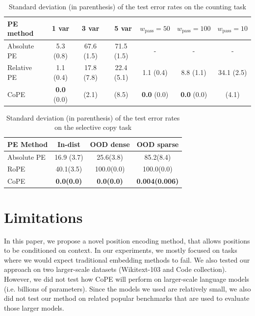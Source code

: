 \documentclass{article}
\newcommand{\ours}{CoPE\xspace}
\newcommand{\std}[1]{\small (#1)}
\begin{document}
\begin{table}[h!]
  \caption{Standard deviation (in parenthesis) of the test error rates on the counting task}
  \label{tab:count_std}
  \centering
  \begin{tabular}{lcccccc}
    \toprule
         PE method   &  1 var &  3 var & \ 5 var & $w_\text{pass}=50$ & $w_\text{pass}=100$ & $w_\text{pass}=10$ \\
    \midrule
    Absolute PE & 5.3 \std{0.8}  & 67.6 \std{1.5} & 71.5 \std{1.5} & - & - & - \\
    Relative PE  & 1.1 \std{0.4} & 17.8 \std{7.8}  & 22.4  \std{5.1} & 1.1 \std{0.4} & 8.8 \std{1.1} & 34.1 \std{2.5} \\
    \ours & {\bf 0.0} \std{0.0} & \phantom{0}{\bf 1.2} \std{2.1}  & \phantom{0}{\bf 7.4} \std{8.5} & {\bf 0.0} \std{0.0} & {\bf 0.0} \std{0.0} & \phantom{0}{\bf 4.0} \std{4.1}\\
    \bottomrule
  \end{tabular}
\end{table}

\begin{table}[h!]
  \caption{Standard deviation (in parenthesis) of the test error rates on the selective copy task}
  \label{tab:copy_std}
  \centering
  \begin{tabular}{lccc}
    \toprule
    PE Method   &  In-dist & OOD dense & OOD sparse  \\
    \midrule
    Absolute PE & 16.9 (3.7) & \phantom{0}25.6(3.8) & \phantom{00}85.2(8.4)\\
    RoPE &  40.1(3.5) & 100.0(0.0) & \phantom{00}100.0(0.0)\\
    \ours  & \phantom{0}\bf0.0(0.0) & \phantom{00}\bf0.0(0.0) &\bf0.004(0.006)\\
    \bottomrule
  \end{tabular}
\end{table}

\section{Limitations}
\label{sec:limitations}
In this paper, we propose a novel position encoding method, that allows
positions to be conditioned on context. In our experiments, we mostly focused on tasks where we would expect traditional embedding methods to fail. We also tested our approach on two larger-scale datasets (Wikitext-103 and Code collection). However, we did not test how \ours will perform on larger-scale language models (i.e. billions of parameters). Since the models we used are relatively small, we also did not test our method on related popular benchmarks that are used to evaluate those larger models.

% 
\end{document}
